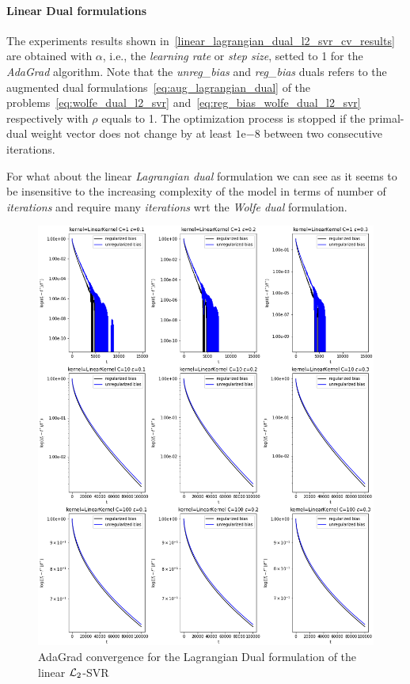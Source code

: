 \paragraph{Linear Dual formulations}

The experiments results shown in~\ref{linear_lagrangian_dual_l2_svr_cv_results} are obtained with $\alpha$, i.e., the \emph{learning rate} or \emph{step size}, setted to 1 for the \emph{AdaGrad} algorithm. Note that the \emph{unreg\_bias} and \emph{reg\_bias} duals refers to the augmented dual formulations~\eqref{eq:aug_lagrangian_dual} of the problems~\eqref{eq:wolfe_dual_l2_svr} and~\eqref{eq:reg_bias_wolfe_dual_l2_svr} respectively with $\rho$ equals to 1. The optimization process is stopped if the primal-dual weight vector does not change by at least $1\mathrm{e}{-8}$  between two consecutive iterations.



For what about the linear \emph{Lagrangian dual} formulation we can see as it seems to be insensitive to the increasing complexity of the model in terms of number of \emph{iterations} and require many \emph{iterations} wrt the \emph{Wolfe dual} formulation.

\begin{figure}[H]
	\centering
	\includegraphics[scale=0.55]{img/linear_lagrangian_dual_l2_svr_loss_history}
	\caption{AdaGrad convergence for the Lagrangian Dual formulation of the linear $\protect \mathcal{L}_2$-SVR}
	\label{fig:linear_lagrangian_dual_l2_svr_loss_history}
\end{figure}

